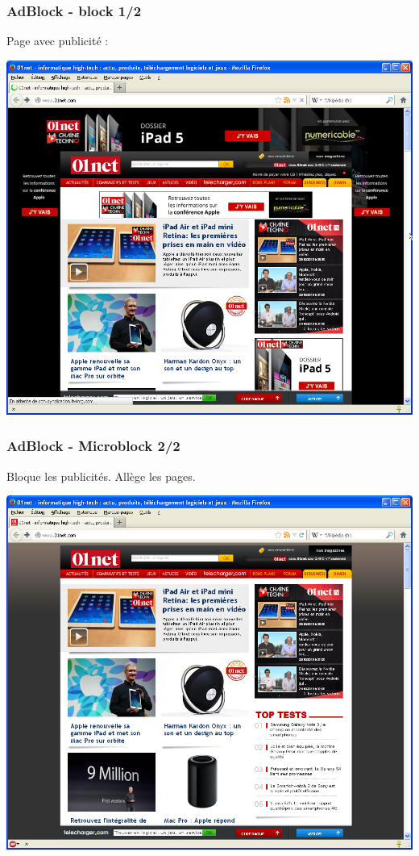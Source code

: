 \documentclass{beamer}
\begin{document}
\begin{frame}
\frametitle{AdBlock - block 1/2}
Page avec publicité :
\begin{center}
\includegraphics[scale=0.4] {./images/Adblock01.png}
\end{center}

\end{frame}

\begin{frame}
\frametitle{AdBlock - Microblock 2/2}
Bloque les publicités. Allège les pages.

\begin{center}
\includegraphics[scale=0.4] {./images/Adblock02.png}
\end{center}
\end{frame}
\end{document}
